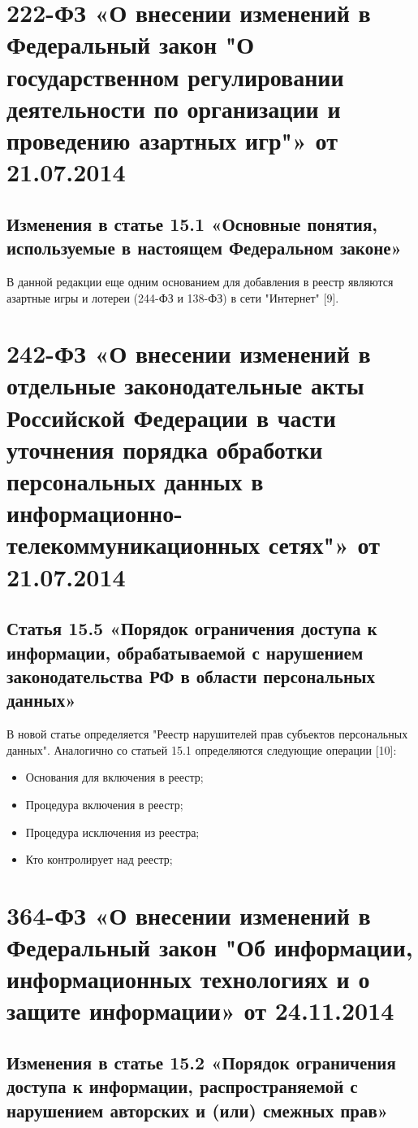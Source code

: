 \documentclass[14pt,a4paper,report]{article}
\begin{document}
\section{222-ФЗ «О внесении изменений в Федеральный закон "О государственном регулировании деятельности по организации и проведению азартных игр"» от 21.07.2014}

\subsection{Изменения в статье 15.1 «Основные понятия, используемые в настоящем Федеральном законе»}

В данной редакции еще одним основанием для добавления в реестр являются азартные игры и лотереи (244-ФЗ и 138-ФЗ) в сети "Интернет" [9].

\section{242-ФЗ «О внесении изменений в отдельные законодательные акты Российской Федерации в части уточнения порядка обработки персональных данных в информационно-телекоммуникационных сетях"» от 21.07.2014}

\subsection{Статья 15.5 «Порядок ограничения доступа к информации, обрабатываемой с нарушением законодательства РФ в области персональных данных»}

В новой статье определяется "Реестр нарушителей прав субъектов персональных данных". Аналогично со статьей 15.1 определяются следующие операции [10]:

\begin{itemize}
	\item Основания для включения в реестр;
	\item Процедура включения в реестр;
	\item Процедура исключения из реестра;
	\item Кто контролирует над реестр;
\end{itemize}

\section{364-ФЗ «О внесении изменений в Федеральный закон "Об информации, информационных технологиях и о защите информации» от 24.11.2014}

\subsection{Изменения в статье 15.2 «Порядок ограничения доступа к информации, распространяемой с нарушением авторских и (или) смежных прав»}
\end{document}
